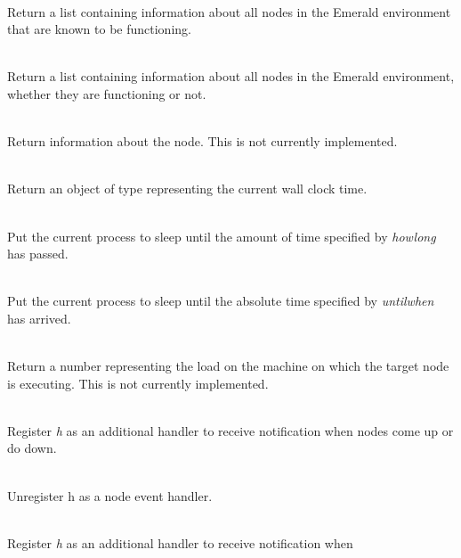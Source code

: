 \begin{desc}
  \item[\kw{operation} getActiveNodes \returns{} \/\LB{}NodeList\/\RB{}]~\\
    Return a list containing information about all nodes in the Emerald
    environment that are known to be functioning.
  \item[\kw{operation} getAllNodes \returns{} \/\LB{}NodeList\/\RB{}]~\\
    Return a list containing information about all nodes in the Emerald
    environment, whether they are functioning or not.
  \item[\kw{operation} getNodeInformation \returns{} \/\LB{}NodeListElement\/\RB{}]~\\
    Return information about the node.  This is not currently implemented.
  \item[\kw{operation} getTimeOfDay \returns{} \/\LB{}Time\/\RB{}]~\\
    Return an object of type  representing the current wall clock
    time.
  \item[\kw{operation} delay\/\LB{}howlong \CO{} Time\/\RB{}]~\\
    Put the current process to sleep until the amount of time specified by
    {\it howlong} has passed.
  \item[\kw{operation} waitUntil\/\LB{}untilwhen \CO{} Time\/\RB{}]~\\
    Put the current process to sleep until the absolute time specified by
    {\it untilwhen} has arrived.
  \item[\kw{operation} getLoadAverage \returns{} \/\LB{}\tn{Real}\/\RB{}]~\\
    Return a  number representing the load on the machine on which
    the target node is executing.  This is not currently implemented.
  \item[\kw{operation} setNodeEventHandler\/\LB{}h \CO{} HandlerType\/\RB{}]~\\
    Register {\it h} as an additional handler to receive notification when
    nodes come up or do down.
  \item[\kw{operation} removeNodeEventHandler\/\LB{}h \CO{} HandlerType\/\RB{}]~\\
    Unregister h as a node event handler.
  \item[\kw{operation} setNearbyNodeEventHandler\/\LB{}h \CO{} HandlerType\/\RB{}]~\\
    Register {\it h} as an additional handler to receive notification when

\end{desc}
